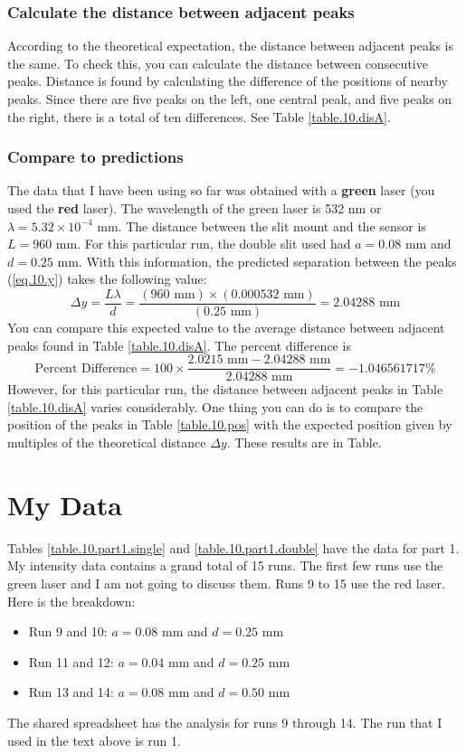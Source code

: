 \subsubsection{Calculate the distance between adjacent peaks}
%
According to the theoretical expectation, the distance between adjacent peaks is the same. To check this, you can calculate the distance between consecutive peaks. Distance is found by calculating the difference of the positions of nearby peaks. Since there are five peaks on the left, one central peak, and five peaks on the right, there is a total of ten differences. See Table \ref{table.10.disA}.
%
\subsubsection{Compare to predictions}
%
The data that I have been using so far was obtained with a \textbf{green} laser (you used the \textbf{red} laser). The wavelength of the green laser is 532 nm or $\lambda = 5.32 \times 10^{-4}$ mm. The distance between the slit mount and the sensor is $L = 960$ mm. For this particular run, the double slit used had $a = 0.08$ mm and $d = 0.25$ mm. With this information, the predicted separation between the peaks (\ref{eq.10.y}) takes the following value:
\begin{equation}
	\Delta y = \frac{L \lambda}{d} = \frac{(960 \text{ mm}) \times (0.000532 \text{ mm})}{(0.25 \text{ mm})} = 2.04288 \text{ mm}
\end{equation}
You can compare this expected value to the average distance between adjacent peaks found in Table \ref{table.10.disA}. The percent difference is
\begin{equation}
	\text{Percent Difference} = 100 \times \frac{2.0215 \text{ mm} - 2.04288 \text{ mm}}{2.04288 \text{ mm}} = -1.046561717 \%
\end{equation}
However, for this particular run, the distance between adjacent peaks in Table \ref{table.10.disA} varies considerably. One thing you can do is to compare the position of the peaks in Table \ref{table.10.pos} with the expected position given by multiples of the theoretical distance $\Delta y$. These results are in Table.
%
\section{My Data}
%
Tables \ref{table.10.part1.single} and \ref{table.10.part1.double} have the data for part 1. My intensity data contains a grand total of 15 runs. The first few runs use the green laser and I am not going to discuss them. Runs 9 to 15 use the red laser. Here is the breakdown:
\begin{itemize}
	\item Run 9 and 10: $a = 0.08$ mm and $d = 0.25$ mm
	\item Run 11 and 12: $a = 0.04$ mm and $d = 0.25$ mm
	\item Run 13 and 14: $a = 0.08$ mm and $d = 0.50$ mm
\end{itemize}
The shared spreadsheet has the analysis for runs 9 through 14. The run that I used in the text above is run 1.
%
